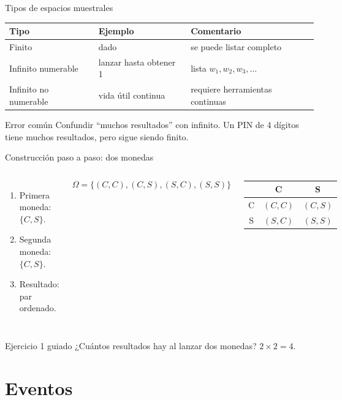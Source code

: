 \documentclass[aspectratio=169,11pt]{beamer}
\begin{document}
\begin{frame}{Tipos de espacios muestrales}
\small
\begin{tabular}{p{}p{}p{}}
\toprule
Tipo & Ejemplo & Comentario \\
\midrule
Finito & dado & se puede listar completo \\
Infinito numerable & lanzar hasta obtener 1 & lista $w_1,w_2,w_3,\ldots$ \\
Infinito no numerable & vida útil continua & requiere herramientas continuas \\
\bottomrule
\end{tabular}
\vspace{0.7em}
\begin{alertblock}{Error común}
Confundir ``muchos resultados'' con infinito. Un PIN de 4 dígitos tiene muchos resultados, pero sigue siendo finito.
\end{alertblock}
\end{frame}

\begin{frame}{Construcción paso a paso: dos monedas}
\begin{columns}[T]
\begin{enumerate}
  \item Primera moneda: $\{C,S\}$.
  \pause
  \item Segunda moneda: $\{C,S\}$.
  \pause
  \item Resultado: par ordenado.
\end{enumerate}
\[
\Omega=\{(C,C),(C,S),(S,C),(S,S)\}
\]
\begin{center}
\begin{tabular}{c|cc}
 & C & S \\
\hline
C & $(C,C)$ & $(C,S)$ \\
S & $(S,C)$ & $(S,S)$ \\
\end{tabular}
\end{center}
\end{columns}
\begin{exampleblock}{Ejercicio 1 guiado}
¿Cuántos resultados hay al lanzar dos monedas? \pause $2\times2=4$.
\end{exampleblock}
\end{frame}

\section{Eventos}
\end{document}
